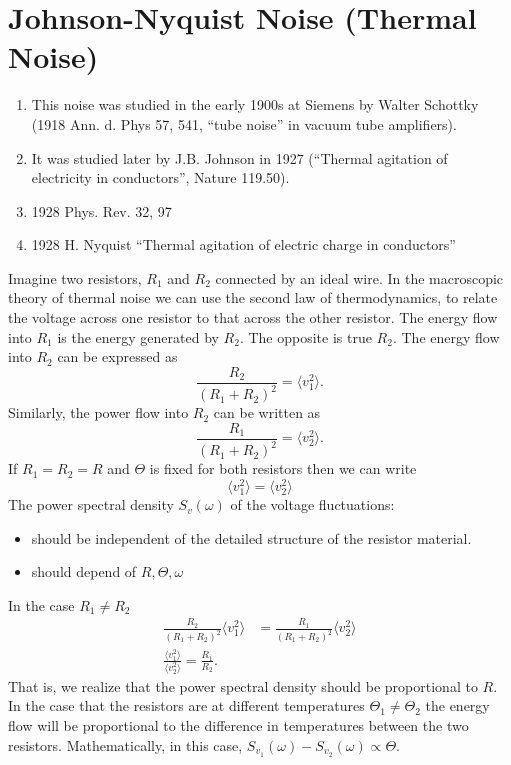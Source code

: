 \documentclass{article}
\begin{document}
\section{Johnson-Nyquist Noise (Thermal Noise)}
\begin{enumerate}
   \item This noise was studied in the early 1900s at Siemens by Walter Schottky
(1918 Ann. d. Phys 57, 541, ``tube noise'' in vacuum tube amplifiers).
\item It was studied later by J.B. Johnson in 1927 (``Thermal agitation of
   electricity in conductors'', Nature 119.50).
\item 1928 Phys. Rev. 32, 97
\item 1928 H. Nyquist ``Thermal agitation of electric charge in conductors''
\end{enumerate}
Imagine two resistors, $ R_{1} $ and $ R_{2} $ connected by an ideal wire. In
the macroscopic theory of thermal noise we can use the second law of
thermodynamics, to relate the voltage across one resistor to that across the
other resistor. The energy flow into $ R_{1} $ is the energy generated by $
R_{2} $. The opposite is true $ R_{2} $. The energy flow into $ R_{2} $ can be
expressed as
\[
   \frac{R_{2}}{\left( R_{1} + R_{2} \right)^2} = \langle v_{1}^{2} \rangle.
\]
Similarly, the power flow into $ R_{2} $ can be written as
\[
   \frac{R_{1}}{\left( R_{1} + R_{2} \right)^2} = \langle v_{2}^{2} \rangle.
\]
If $ R_{1} = R_{2} = R $ and $ \Theta $ is fixed for both resistors then we can
write
\[
   \langle v_{1}^{2}\rangle = \langle v_{2}^{2}\rangle
\]
The power spectral density $ S_{v}(\omega) $ of the voltage fluctuations:
\begin{itemize}
   \item should be independent of the detailed structure of the resistor material.
   \item should depend of $ R,\Theta, \omega $
\end{itemize}
In the case $ R_{1} \ne R_{2} $
\begin{align*}
   \frac{R_{2}}{\left( R_{1} + R_{2} \right)^2}\langle v_{1}^{2} \rangle &=
   \frac{R_{1}}{\left( R_{1} + R_{2} \right)^2}\langle v_{2}^{2} \rangle \\
   \frac{\langle v_{1}^{2}\rangle}{\langle v_{2}^{2}\rangle} =
   \frac{R_{1}}{R_{2}}.
\end{align*}
That is, we realize that the power spectral density should be proportional to $
R $. In the case that the resistors are at different temperatures $ \Theta_{1}
\ne \Theta_{2} $ the energy flow will be proportional to the difference in
temperatures between the two resistors. Mathematically, in this case, $
S_{v_{1}}(\omega) - S_{v_{2}}(\omega) \propto \Theta $.
\end{document}

